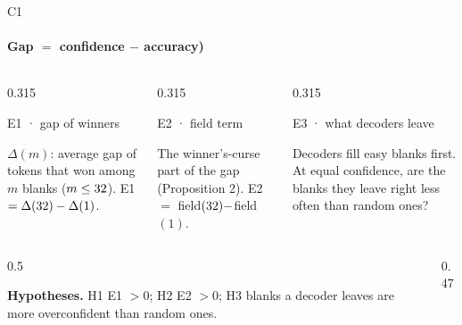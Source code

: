 \documentclass[aspectratio=169,10pt,t]{beamer}
\newcommand{\lbl}[1]{{\color{accentdark}\firasemibold #1}}
\newcommand{\paneltitle}[1]{{\color{accentdark}\small\firasemibold #1}\par\vspace{0.8mm}}
\begin{document}
\begin{frame}{C1}
  \framesubtitle{Gap $=$ confidence $-$ accuracy)}
  \vspace{0.5mm}
  \begin{columns}[T,onlytextwidth]
    \begin{column}{0.315\textwidth}
      \begin{panel}[height=23mm]
        \paneltitle{E1 · gap of winners}
        $\Delta(m)$: average gap of tokens that won among $m$ blanks
        ($m \le 32$). E1 $= \Delta(32) - \Delta(1)$.
      \end{panel}
    \end{column}
    \begin{column}{0.315\textwidth}
      \begin{panel}[height=23mm]
        \paneltitle{E2 · field term}
        The winner's-curse part of the gap (Proposition 2).
        E2 $=$ field$(32)-$field$(1)$.
      \end{panel}
    \end{column}
    \begin{column}{0.315\textwidth}
      \begin{panel}[height=23mm]
        \paneltitle{E3 · what decoders leave}
        Decoders fill easy blanks first. At equal confidence, are the blanks they leave
        right less often than random ones?
      \end{panel}
    \end{column}
  \end{columns}
  \vspace{2.5mm}
  \begin{columns}[T,onlytextwidth]
    \begin{column}{0.5\textwidth}
      \footnotesize\raggedright
      \textbf{Hypotheses.} \lbl{H1} E1 $> 0$; \lbl{H2} E2 $> 0$;
      \lbl{H3} blanks a decoder leaves are more overconfident than random ones.\par\vspace{1.5mm}
    \end{column}
    \begin{column}{0.47\textwidth}

\end{column}
\end{columns}
\end{frame}
\end{document}

